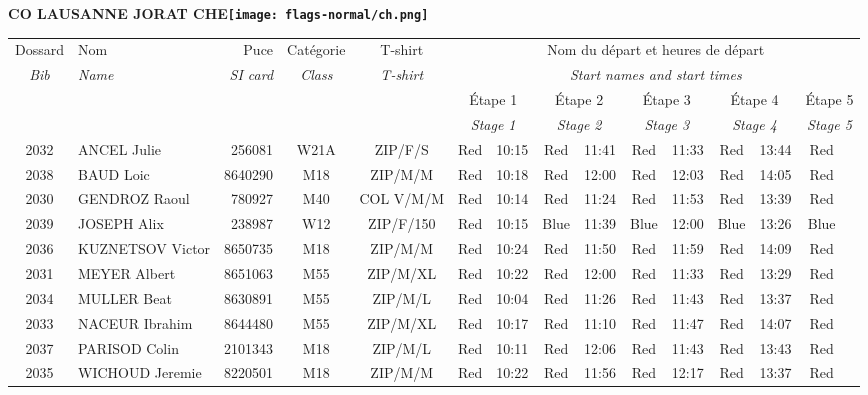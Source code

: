 \documentclass{report}
\begin{document}
\newpage
  \Huge \centering \bfseries CO LAUSANNE JORAT  CHE\normalfont \footnotesize \sffamily \hfill \texttt{[image: flags-normal/ch.png]} \newline 
  \begin{longtable}{|c|l|r|c|c|*{5}{cc|}}
    Dossard & Nom  & Puce    & Catégorie & T-shirt & \multicolumn{10}{c|}{Nom du départ et heures de départ} \\
    \itshape Bib     & \itshape Name & \itshape SI card & \itshape Class  & \itshape  T-shirt  & \multicolumn{10}{c|}{\itshape Start names and start times} \\
    \hline
    & & & & & \multicolumn{2}{c|}{Étape 1} & \multicolumn{2}{c|}{Étape 2} & \multicolumn{2}{c|}{Étape 3} & \multicolumn{2}{c|}{Étape 4} & \multicolumn{2}{c|}{Étape 5} \\
    & & & & & \multicolumn{2}{c|}{\itshape Stage 1} & \multicolumn{2}{c|}{\itshape Stage 2} & \multicolumn{2}{c|}{\itshape Stage 3} & \multicolumn{2}{c|}{\itshape Stage 4} & \multicolumn{2}{c|}{\itshape Stage 5} \\
    \hline
    2032 & ANCEL Julie & 256081 & W21A & ZIP/F/S & Red & 10:15 & Red & 11:41 & Red & 11:33 & Red & 13:44 & Red &  \\
    2038 & BAUD Loic & 8640290 & M18 & ZIP/M/M & Red & 10:18 & Red & 12:00 & Red & 12:03 & Red & 14:05 & Red &  \\
    2030 & GENDROZ Raoul & 780927 & M40 & COL V/M/M & Red & 10:14 & Red & 11:24 & Red & 11:53 & Red & 13:39 & Red &  \\
    2039 & JOSEPH Alix & 238987 & W12 & ZIP/F/150 & Red & 10:15 & Blue & 11:39 & Blue & 12:00 & Blue & 13:26 & Blue &  \\
    2036 & KUZNETSOV Victor & 8650735 & M18 & ZIP/M/M & Red & 10:24 & Red & 11:50 & Red & 11:59 & Red & 14:09 & Red &  \\
    2031 & MEYER Albert & 8651063 & M55 & ZIP/M/XL & Red & 10:22 & Red & 12:00 & Red & 11:33 & Red & 13:29 & Red &  \\
    2034 & MULLER Beat & 8630891 & M55 & ZIP/M/L & Red & 10:04 & Red & 11:26 & Red & 11:43 & Red & 13:37 & Red &  \\
    2033 & NACEUR Ibrahim & 8644480 & M55 & ZIP/M/XL & Red & 10:17 & Red & 11:10 & Red & 11:47 & Red & 14:07 & Red &  \\
    2037 & PARISOD Colin & 2101343 & M18 & ZIP/M/L & Red & 10:11 & Red & 12:06 & Red & 11:43 & Red & 13:43 & Red &  \\
    2035 & WICHOUD Jeremie & 8220501 & M18 & ZIP/M/M & Red & 10:22 & Red & 11:56 & Red & 12:17 & Red & 13:37 & Red &  \\
  \end{longtable}
\end{document}
